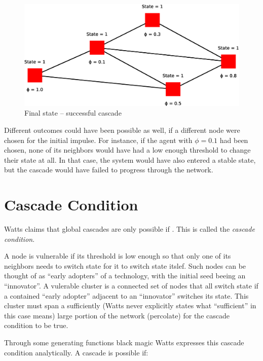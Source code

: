 \documentclass{sig-alternate-05-2015}
\begin{document}
\begin{figure}[h!]
    \includegraphics[width=\columnwidth]{../presentation/img/model9}
    \centering
    \caption{Final state -- successful cascade}
    \label{fig:model5}
\end{figure}

Different outcomes could have been possible as well, if a different node were chosen for the initial impulse. For instance, if the agent with $\phi = 0.1$ had been chosen, none of its neighbors would have had a low enough threshold to change their state at all. In that case, the system would have also entered a stable state, but the cascade would have failed to progress through the network.


\section{Cascade Condition}\label{sec:section}

Watts claims that global cascades are only possible if . This is called the \emph{cascade condition}.

A node is vulnerable if its threshold is low enough so that only one of its neighbors needs to switch state for it to switch state itslef. Such nodes can be thought of as ``early adopters'' of a technology, with the initial seed beeing an ``innovator''. A vulerable cluster is a connected set of nodes that all switch state if a contained ``early adopter'' adjacent to an ``innovator'' switches its state. This cluster must span a sufficiently (Watts never explicitly states what ``sufficient'' in this case means) large portion of the network (percolate) for the cascade condition to be true.

Through some generating functions black magic Watts expresses this cascade condition analytically. A cascade is possible if:
\end{document}
